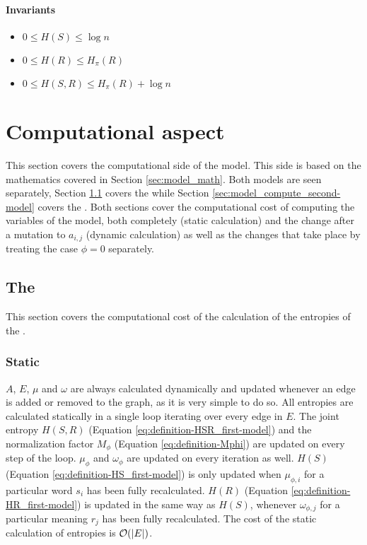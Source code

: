 \paragraph{Invariants}
\begin{itemize}
\item $0 \leq H(S) \leq \log n$
\item $0 \leq H(R) \leq H_\pi(R)$
\item $0 \leq H(S,R) \leq H_\pi(R) + \log n$
\end{itemize}

\section{Computational aspect}
\label{sec:model_compute}

This section covers the computational side of the model.
This side is based on the mathematics covered in Section \ref{sec:model_math}.
Both models are seen separately, Section \ref{sec:model_compute_first-model} covers the \firstmodel{} while Section \ref{sec:model_compute_second-model} covers the \secondmodel{}.
 Both sections cover the computational cost of computing the variables of the model, both completely (static calculation) and the change after a mutation to $a_{i,j}$ (dynamic calculation) as well as the changes that take place by treating the case $\phi=0$ separately.

\subsection{The \firstmodel{}}
\label{sec:model_compute_first-model}

This section covers the computational cost of the calculation of the entropies of the \firstmodel{}.

\subsubsection{Static}

$A$, $E$, $\mu$ and $\omega$ are always calculated dynamically and updated whenever an edge is added or removed to the graph, as it is very simple to do so.
All entropies are calculated statically in a single loop iterating over every edge in $E$.
The joint entropy $H(S,R)$ (Equation \eqref{eq:definition-HSR_first-model}) and the normalization factor $M_\phi$ (Equation \eqref{eq:definition-Mphi}) are updated on every step of the loop.
$\mu_\phi$ and $\omega_\phi$ are updated on every iteration as well.
$H(S)$ (Equation \eqref{eq:definition-HS_first-model}) is only updated when $\mu_{\phi,i}$ for a particular word $s_i$ has been fully recalculated.
$H(R)$ (Equation \eqref{eq:definition-HR_first-model}) is updated in the same way as $H(S)$, whenever $\omega_{\phi,j}$ for a particular meaning $r_j$ has been fully recalculated.
The cost of the static calculation of entropies is $\mathcal{O}(|E|)$.

